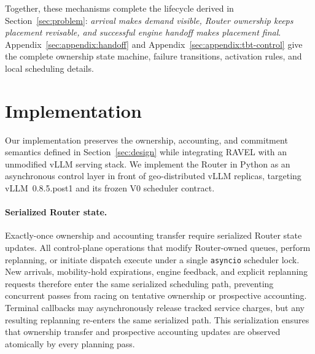 \documentclass[letterpaper,twocolumn,10pt]{article}
\begin{document}
Together, these mechanisms complete the lifecycle derived in
Section~\ref{sec:problem}:
\emph{arrival makes demand visible, Router ownership keeps placement revisable,
and successful engine handoff makes placement final}.
Appendix~\ref{sec:appendix:handoff} and
Appendix~\ref{sec:appendix:tbt-control} give the complete ownership state
machine, failure transitions, activation rules, and local scheduling details.

\section{Implementation}
\label{sec:implementation}

Our implementation preserves the ownership, accounting, and commitment
semantics defined in Section~\ref{sec:design} while integrating RAVEL with an
unmodified vLLM serving stack.
We implement the Router in Python as an asynchronous control layer in front of
geo-distributed vLLM replicas, targeting vLLM~0.8.5.post1 and its frozen V0
scheduler contract.

\paragraph{Serialized Router state.}
Exactly-once ownership and accounting transfer require serialized Router state
updates.
All control-plane operations that modify Router-owned queues, perform
replanning, or initiate dispatch execute under a single \texttt{asyncio}
scheduler lock.
New arrivals, mobility-hold expirations, engine feedback, and explicit
replanning requests therefore enter the same serialized scheduling path,
preventing concurrent passes from racing on tentative ownership or prospective
accounting.
Terminal callbacks may asynchronously release tracked service charges, but any
resulting replanning re-enters the same serialized path.
This serialization ensures that ownership transfer and prospective accounting
updates are observed atomically by every planning pass.
\end{document}
